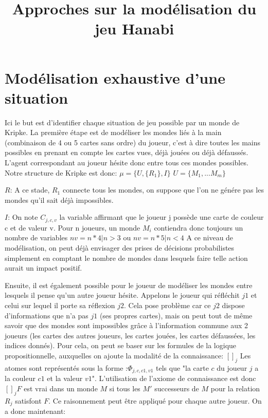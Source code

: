 \documentclass{article}
\title{Approches sur la modélisation du jeu Hanabi}
\date{}
\begin{document}
\maketitle

\section{Modélisation exhaustive d'une situation}


    Ici le but est d'identifier chaque situation de jeu possible par un monde de Kripke.
La première étape est de modéliser les mondes liés à la main (combinaison de 4 ou 5 cartes sans
ordre) du joueur, c'est à dire toutes les mains possibles en prenant en compte les cartes vues, déjà jouées ou déjà défaussés. L'agent correspondant au joueur hésite donc entre tous ces mondes possibles.
Notre structure de Kripke est donc:
\smallbreak
$   \mu=\{U,\{R_{1}\},I \}  $
$   U=\{M_{1},...M_{m} \}   $

$R$: A ce stade, $R_{1}$ connecte tous les mondes, on suppose que l'on ne génére pas les mondes qu'il sait déjà impossibles.

$I$: On note    $C_{j,c,v}$ la variable affirmant que le joueur j possède une carte de couleur c et de valeur v. Pour n joueurs, un monde $M_{i}$ contiendra donc toujours un nombre de variables $nv=n*4 | n>3$ ou $nv=n*5 | n<4$
\smallbreak
A ce niveau de modélisation, on peut déjà envisager des prises de décisions probabilistes simplement en comptant le nombre de mondes dans lesquels faire telle action aurait un impact positif.

Ensuite, il est également possible pour le joueur de modéliser les mondes entre lesquels il pense qu'un autre joueur hésite. Appelons le joueur qui réfléchit $j1$ et celui sur lequel il porte sa réflexion $j2$. Cela pose problème car ce $j2$ dispose d'informations que n'a pas $j1$ (ses propres cartes), mais on peut tout de même savoir que des mondes sont impossibles grâce à l'information commune aux 2 joueurs (les cartes des autres joueurs, les cartes jouées, les cartes défaussées, les indices donnés).
Pour cela, on peut se baser sur les formules de la logique propositionnelle, auxquelles on ajoute la modalité de la connaissance: $[]_j$ Les atomes sont représentés sous la forme :$\Phi_{j,c,c1,v1}$ tels que "la carte $c$ du joueur $j$ a la couleur $c1$ et la valeur $v1$". L'utilisation de l'axiome de connaissance est donc   $[]_j F$ est vrai dans un monde $M$ si tous les $M'$ successeurs de $M$ pour la relation $R_j$ satisfont $F$. Ce raisonnement peut être appliqué pour chaque autre joueur.
On a donc maintenant:
\end{document}
